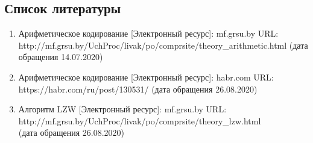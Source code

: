 \documentclass[12pt]{article}
\begin{document}
\subsection*{Список литературы}
\begin{enumerate}
	\item Арифметическое кодирование [Электронный ресурс]: mf.grsu.by URL:\\ http://mf.grsu.by/UchProc/livak/po/comprsite/theory\_arithmetic.html (дата обращения 14.07.2020)
	\item Арифметическое кодирование [Электронный ресурс]: habr.com URL:\\ https://habr.com/ru/post/130531/ (дата обращения 26.08.2020)
	\item Алгоритм LZW [Электронный ресурс]: mf.grsu.by URL:\\ http://mf.grsu.by/UchProc/livak/po/comprsite/theory\_lzw.html \\(дата обращения 26.08.2020)
\end{enumerate}
\end{document}
